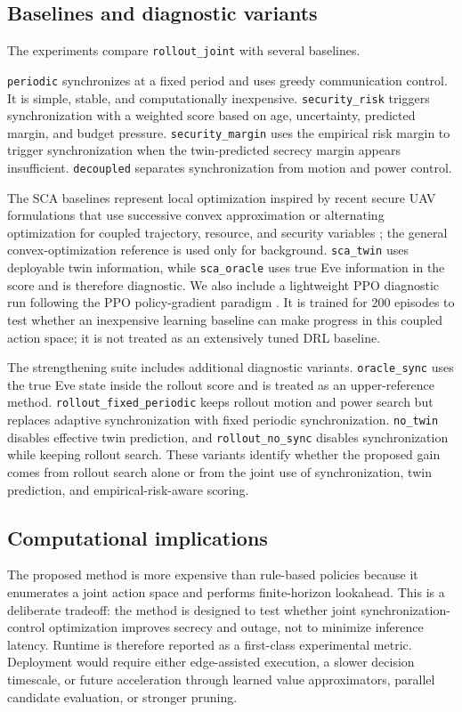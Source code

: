 \subsection{Baselines and diagnostic variants}

The experiments compare \texttt{rollout\_joint} with several baselines.

\texttt{periodic} synchronizes at a fixed period and uses greedy communication control. It is simple, stable, and computationally inexpensive. \texttt{security\_risk} triggers synchronization with a weighted score based on age, uncertainty, predicted margin, and budget pressure. \texttt{security\_margin} uses the empirical risk margin to trigger synchronization when the twin-predicted secrecy margin appears insufficient. \texttt{decoupled} separates synchronization from motion and power control.

The SCA baselines represent local optimization inspired by recent secure UAV formulations that use successive convex approximation or alternating optimization for coupled trajectory, resource, and security variables \cite{mao2023secureuavmec,wei2024isncsecureuav,lu2024securemaritimemec,liu2024secureisacuav}; the general convex-optimization reference \cite{boyd2004convex} is used only for background. \texttt{sca\_twin} uses deployable twin information, while \texttt{sca\_oracle} uses true Eve information in the score and is therefore diagnostic. We also include a lightweight PPO diagnostic run following the PPO policy-gradient paradigm \cite{schulman2017ppo}. It is trained for 200 episodes to test whether an inexpensive learning baseline can make progress in this coupled action space; it is not treated as an extensively tuned DRL baseline.

The strengthening suite includes additional diagnostic variants. \texttt{oracle\_sync} uses the true Eve state inside the rollout score and is treated as an upper-reference method. \texttt{rollout\_fixed\_periodic} keeps rollout motion and power search but replaces adaptive synchronization with fixed periodic synchronization. \texttt{no\_twin} disables effective twin prediction, and \texttt{rollout\_no\_sync} disables synchronization while keeping rollout search. These variants identify whether the proposed gain comes from rollout search alone or from the joint use of synchronization, twin prediction, and empirical-risk-aware scoring.

\subsection{Computational implications}

The proposed method is more expensive than rule-based policies because it enumerates a joint action space and performs finite-horizon lookahead. This is a deliberate tradeoff: the method is designed to test whether joint synchronization-control optimization improves secrecy and outage, not to minimize inference latency. Runtime is therefore reported as a first-class experimental metric. Deployment would require either edge-assisted execution, a slower decision timescale, or future acceleration through learned value approximators, parallel candidate evaluation, or stronger pruning.
